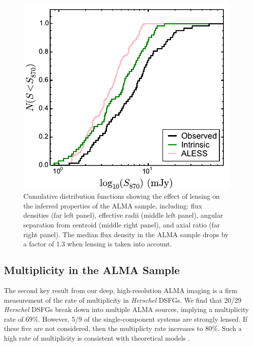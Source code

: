 \documentclass[iop]{emulateapj}
\begin{document}
\begin{figure}[!tbp] 
\includegraphics[width=\linewidth]{../Figures/f870_delens.pdf}

\caption{ Cumulative distribution functions showing the effect of lensing on
the inferred properties of the ALMA sample, including: flux densities (far left
panel), effective radii (middle left panel), angular separation from centroid
(middle right panel), and axial ratio (far right panel).  The median flux
density in the ALMA sample drops by a factor of 1.3 when lensing is taken into
account.  } \label{fig:delens}

\end{figure}

\subsection{Multiplicity in the ALMA Sample}\label{sec:multiplicity}

The second key result from our deep, high-resolution ALMA imaging is a firm
measurement of the rate of multiplicity in {\it Herschel} DSFGs.  We find that
20/29 {\it Herschel} DSFGs break down into multiple ALMA sources, implying a
multiplicity rate of 69\%.  
However, 5/9 of the single-component
systems are strongly lensed.  If these five are not considered, then the
multiplicty rate increases to 80\%.  Such a high rate of multiplicity is
consistent with theoretical models \citep{HN13, HB13}.
\end{document}
